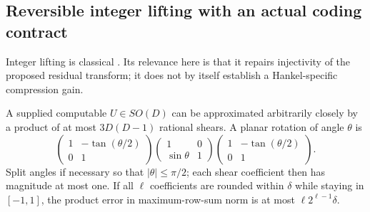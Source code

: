 \subsection{Reversible integer lifting with an actual coding contract}
\label{III:U:sec:integer-lifting}
Integer lifting is classical \citep{calderbank1998}. Its relevance here
is that it repairs injectivity of the proposed residual transform;
it does not by itself establish a Hankel-specific compression gain.

\begin{lemma}
\label{III:U:lem:rotation-lifts}
A supplied computable $U\in SO(D)$ can be approximated arbitrarily
closely by a product of at most $3D(D-1)$ rational shears. A planar
rotation of angle $\theta$ is
\[
 \begin{pmatrix}1&-\tan(\theta/2)\\0&1\end{pmatrix}
 \begin{pmatrix}1&0\\\sin\theta&1\end{pmatrix}
 \begin{pmatrix}1&-\tan(\theta/2)\\0&1\end{pmatrix}.
\]
Split angles if necessary so that $|\theta|\le\pi/2$; each shear
coefficient then has magnitude at most one. If all $\ell$ coefficients
are rounded within $\delta$ while staying in $[-1,1]$, the product
error in maximum-row-sum norm is at most $\ell2^{\ell-1}\delta$.
\end{lemma}


